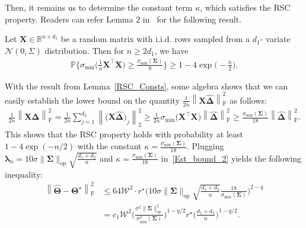 \documentclass[alpha-refs]{wiley-article}
\begin{document}
\noindent
Then, it remains us to determine the constant term $\kappa$, which satisfies the RSC property.
Readers can refer Lemma $2$ in~\citet{negahban2011estimation} for the following result.
\begin{lemma}\label{RSC_Consts}
Let $\boldsymbol{X} \in \mathbb{R}^{n \times d_{1}}$ be a random matrix with i.i.d. rows sampled from a $d_{1}$-
variate $\mathcal{N}(0,\Sigma)$ distribution. Then for $n \geq 2d_{1}$, we have
\begin{align*}
    \mathbb{P}\Bigg\{ \sigma_{\text{min}}\bigg(\frac{1}{n}\boldsymbol{X}^{\top}\boldsymbol{X}\bigg) \geq \frac{\sigma_{\text{min}}(\boldsymbol{\Sigma})}{9} \Bigg\} \geq 1 - 4\exp \bigg( -\frac{n}{2} \bigg).
\end{align*}
\end{lemma}
\noindent
With the result from Lemma~\ref{RSC_Consts}, some algebra shows that
we can easily establish the lower bound on the quantity $\frac{1}{2n} \left\| \boldsymbol{X}\boldsymbol{\widehat{\Delta}} \right\|_{\text{F}}^{2}$ as follows:
\begin{align*}
    \frac{1}{2n} \left\| \boldsymbol{X}\boldsymbol{\widehat{\Delta}} \right\|_{\text{F}}^{2}
    = \frac{1}{2n} \sum_{j=1}^{d_{2}} \left\| \big(\boldsymbol{X}\boldsymbol{\widehat{\Delta}}\big)_{j} \right\|_{2}^{2}
    \geq \frac{1}{2n}\sigma_{\text{min}}\big( \boldsymbol{X}^{\top} \boldsymbol{X} \big)
    \left\| \boldsymbol{\widehat{\Delta}} \right\|_{\text{F}}^{2}
    \geq \frac{\sigma_{\text{min}}(\boldsymbol{\Sigma})}{18} \left\| \boldsymbol{\widehat{\Delta}} \right\|_{\text{F}}^{2}.
\end{align*}
This shows that the RSC property holds with probability at least $ 1 - 4\exp ( -n/2 )$ with the constant $\kappa=\frac{\sigma_{\text{min}}(\boldsymbol{\Sigma})}{18}$.
Plugging $\boldsymbol{\lambda}_{n}=10 \sigma \|\boldsymbol{\Sigma}\|_{\text{op}} \sqrt{\frac{d_{1}+d_{2}}{n}}$ and $\kappa = \frac{\sigma_{\text{min}}(\boldsymbol{\Sigma})}{18}$ in~\eqref{Est_bound_2} yields the following inequality:
\begin{align*}
    \left\| \widehat{\boldsymbol{\Theta}} - \boldsymbol{\Theta^{\star}} \right\|_{\text{F}}^{2}
    &\leq 64 \mathcal{W}^{2} \cdot r^{\star} \Bigg(10 \sigma \|\boldsymbol{\Sigma}\|_{\text{op}} \sqrt{\frac{d_{1}+d_{2}}{n}} \frac{18}{\sigma_{\text{min}}(\boldsymbol{\Sigma})} \Bigg)^{2-q} \\
    &= c_{1} \mathcal{W}^{2} \Bigg( \frac{\sigma^{2}\|\boldsymbol{\Sigma}\|_{\text{op}}^{2}}{\sigma_{\text{min}}^{2}(\boldsymbol{\Sigma})} \Bigg)^{1-q/2} r^{\star} \Bigg( \frac{d_{1}+d_{2}}{n} \Bigg)^{1-q/2}.
\end{align*}
\end{document}

